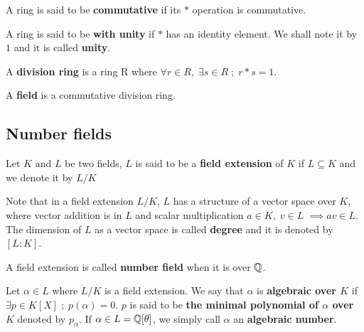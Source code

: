 \documentclass[a4paper,12pt]{article}
\begin{document}
\begin{definition}
  A ring is said to be \textbf{commutative} if its $*$ operation is commutative.
\end{definition}

\begin{definition}
  A ring is said to be \textbf{with unity} if $*$ has an identity element. We
  shall note it by $1$ and it is called \textbf{unity}.

\end{definition}

\begin{definition}
  A \textbf{division ring} is a ring R where $\forall r \in R, \; \exists s \in R \; ; \; r*s = 1$.
\end{definition}

\begin{definition}
  A \textbf{field} is a commutative division ring.
\end{definition}

\subsection{Number fields}
\label{sec:org5a63c82}

   \begin{definition}
  Let $K$ and $L$ be two fields, $L$ is said to be a \textbf{field extension} of
  $K$ if $L \subseteq K$ and we denote it by $L/K$
\end{definition}

Note that in a field extension \(L/K\), \(L\) has a structure of a vector space over
\(K\), where vector addition is in \(L\) and scalar multiplication \(a \in K, \; v \in L
   \; \implies av \in L\). The dimension of \(L\) as a vector space is called
\textbf{degree} and it is denoted by \([L:K]\).

\begin{definition}
  A field extension is called \textbf{number field} when it is over $\mathbb{Q}$.
\end{definition}

\begin{definition}
  Let $\alpha \in L$ where $L/K$ is a field extension. We say that $\alpha$ is
  \textbf{algebraic over $K$} if $\exists p \in K[X] \;;\; p(\alpha) = 0$. $p$ is said to be
  \textbf{the minimal polynomial of $\alpha$ over $K$} denoted by $p_\alpha$. If $\alpha \in L =
  \mathbb{Q}[\theta]$, we simply call $\alpha$ an \textbf{algebraic number}.
\end{definition}
\end{document}
